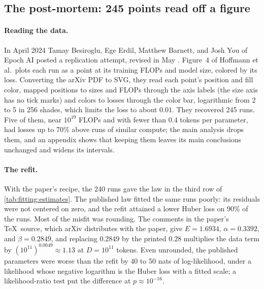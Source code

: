 \begin{refsection}
\section{The post-mortem: 245 points read off a figure}\label{sec:fitting:postmortem}

\paragraph{Reading the data.} In April 2024 Tamay Besiroglu, Ege Erdil, Matthew Barnett, and Josh You of Epoch AI posted a replication attempt, revised in May \parencite{BesirogluEtAl2024}. Figure~4 of Hoffmann et al.\ plots each run as a point at its training FLOPs and model size, colored by its loss. Converting the arXiv PDF to SVG, they read each point's position and fill color, mapped positions to sizes and FLOPs through the axis labels (the size axis has no tick marks) and colors to losses through the color bar, logarithmic from 2 to 5 in 256 shades, which limits the loss to about $0.01$. They recovered 245 runs. Five of them, near $10^{19}$ FLOPs and with fewer than $0.4$ tokens per parameter, had losses up to 70\% above runs of similar compute; the main analysis drops them, and an appendix shows that keeping them leaves its main conclusions unchanged and widens its intervals.

\paragraph{The refit.} With the paper's recipe, the 240 runs gave the law in the third row of \cref{tab:fitting:estimates}. The published law fitted the same runs poorly: its residuals were not centered on zero, and the refit attained a lower Huber loss on 90\% of the runs. Most of the misfit was rounding. The comments in the paper's \TeX\ source, which arXiv distributes with the paper, give $E=1.6934$, $\alpha=0.3392$, and $\beta=0.2849$, and replacing $0.2849$ by the printed $0.28$ multiplies the data term by $(10^{11})^{0.0049}\approx1.13$ at $D=10^{11}$ tokens. Even unrounded, the published parameters were worse than the refit by 40 to 50 nats of log-likelihood, under a likelihood whose negative logarithm is the Huber loss with a fitted scale; a likelihood-ratio test put the difference at $p\approx10^{-16}$.


\end{refsection}
